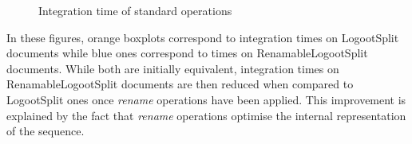 \documentclass[10pt,journal,compsoc]{IEEEtran}
\let\MYoriglatexcaption\caption
\renewcommand{\caption}[2][\relax]{\MYoriglatexcaption[#2]{#2}}
\begin{document}
\begin{figure}[t!]
    \centering
    \hfil
    \caption{Integration time of standard operations}
    \label{fig:evolution-integration-time-insert}
\end{figure}

In these figures, orange boxplots correspond to integration times on LogootSplit documents while blue ones correspond to times on RenamableLogootSplit documents.
While both are initially equivalent, integration times on RenamableLogootSplit documents are then reduced when compared to LogootSplit ones once \emph{rename} operations have been applied.
This improvement is explained by the fact that \emph{rename} operations optimise the internal representation of the sequence.
\end{document}
